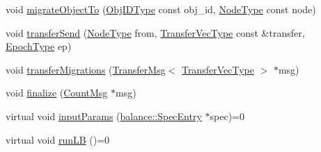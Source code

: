 \begin{DoxyCompactItemize}
\item 
void \hyperlink{structvt_1_1vrt_1_1collection_1_1lb_1_1_base_l_b_a952846044ca0d13d25ca828b84112d0e}{migrate\+Object\+To} (\hyperlink{structvt_1_1vrt_1_1collection_1_1lb_1_1_base_l_b_a15a2f756b59c8c2437985206b32aa403}{Obj\+I\+D\+Type} const obj\+\_\+id, \hyperlink{namespacevt_a866da9d0efc19c0a1ce79e9e492f47e2}{Node\+Type} const node)
\item 
void \hyperlink{structvt_1_1vrt_1_1collection_1_1lb_1_1_base_l_b_a60135618fefc0ad5d09638f29a848be7}{transfer\+Send} (\hyperlink{namespacevt_a866da9d0efc19c0a1ce79e9e492f47e2}{Node\+Type} from, \hyperlink{structvt_1_1vrt_1_1collection_1_1lb_1_1_base_l_b_a329e8179ec41a1bd4924c79fe23a79af}{Transfer\+Vec\+Type} const \&transfer, \hyperlink{namespacevt_a985a5adf291c34a3ca263b3378388236}{Epoch\+Type} ep)
\item 
void \hyperlink{structvt_1_1vrt_1_1collection_1_1lb_1_1_base_l_b_adb9e1197bc690340bc1a4a6c77ac5254}{transfer\+Migrations} (\hyperlink{structvt_1_1vrt_1_1collection_1_1lb_1_1_transfer_msg}{Transfer\+Msg}$<$ \hyperlink{structvt_1_1vrt_1_1collection_1_1lb_1_1_base_l_b_a329e8179ec41a1bd4924c79fe23a79af}{Transfer\+Vec\+Type} $>$ $\ast$msg)
\item 
void \hyperlink{structvt_1_1vrt_1_1collection_1_1lb_1_1_base_l_b_a66f2b22d12492c145a3d567ebd67194b}{finalize} (\hyperlink{structvt_1_1vrt_1_1collection_1_1lb_1_1_count_msg}{Count\+Msg} $\ast$msg)
\item 
virtual void \hyperlink{structvt_1_1vrt_1_1collection_1_1lb_1_1_base_l_b_a555e29aadfd428383464d6dd007506b6}{input\+Params} (\hyperlink{structvt_1_1vrt_1_1collection_1_1balance_1_1_spec_entry}{balance\+::\+Spec\+Entry} $\ast$spec)=0
\item 
virtual void \hyperlink{structvt_1_1vrt_1_1collection_1_1lb_1_1_base_l_b_a69a398c54f8129f365171a1189ffcd84}{run\+LB} ()=0
\end{DoxyCompactItemize}
